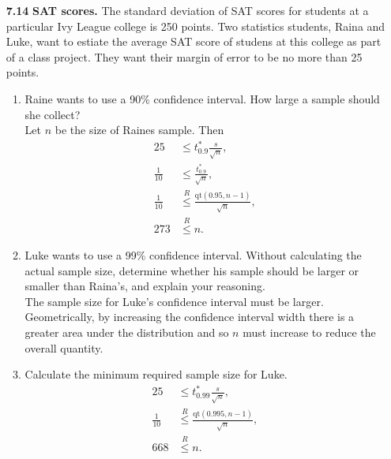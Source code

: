 \documentclass[a4paper, 12pt]{../../config/homework}
\begin{document}
\begin{enumerate}
\pagebreak
\item[\textbf{7.14}] \textbf{SAT scores.} The standard deviation of SAT scores for students at a particular Ivy League college is 250 points. Two statistics students, Raina and Luke, want to estiate the average SAT score of studens at this college as part of a class project. They want their margin of error to be no more than 25 points.
\begin{enumerate}[label=(\alph*)]
\item Raine wants to use a 90\% confidence interval. How large a sample should she collect?
\\Let \(n\) be the size of Raines sample. Then
\begin{align*}
25 &\le t^*_{0.9} \frac{s}{\sqrt{n}},\\
\frac{1}{10} &\le \frac{t^*_{0.9}}{\sqrt{n}},\\
\frac{1}{10} &\overset{R}{\le} \frac{\text{qt}(0.95, n-1)}{\sqrt{n}},\\
273 &\overset{R}{\le} n.
\end{align*}
\item Luke wants to use a 99\% confidence interval. Without calculating the actual sample size, determine whether his sample should be larger or smaller than Raina's, and explain your reasoning.
\\The sample size for Luke's confidence interval must be larger. Geometrically, by increasing the confidence interval width there is a greater area under the distribution and so \(n\) must increase to reduce the overall quantity.
\item Calculate the minimum required sample size for Luke.
\begin{align*}
25 &\le t^*_{0.99} \frac{s}{\sqrt{n}},\\
\frac{1}{10} &\overset{R}{\le} \frac{\text{qt}(0.995, n-1)}{\sqrt{n}},\\
668 &\overset{R}{\le} n.
\end{align*}
\end{enumerate}


\end{enumerate}
\end{document}
